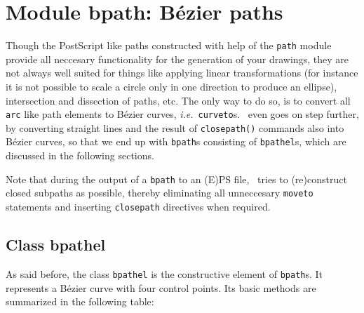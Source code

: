 \chapter{Module bpath: B\'ezier paths}

\label{bpath}

Though the PostScript like paths constructed with help of the
\verb|path| module provide all neccesary functionality for the
generation of your drawings, they are not always well suited for
things like applying linear transformations (for instance it is not
possible to scale a circle only in one direction to produce an
ellipse), intersection and dissection of paths, etc. The only way to
do so, is to convert all \verb|arc| like path elements to B\'ezier
curves, \textit{i.e.}\ \verb|curveto|s. \PyX\ even goes on step further, by
converting straight lines and the result of \verb|closepath()|
commands also into B\'ezier curves, so that we end up with \verb|bpath|s
consisting of \verb|bpathel|s, which are discussed in the following
sections.

Note that during the output of a \verb|bpath| to an (E)PS file, \PyX\ tries to
(re)construct closed subpaths as possible, thereby eliminating all
unneccesary \texttt{moveto} statements and inserting
\texttt{closepath} directives when required.

\section{Class bpathel}

As said before, the class \verb|bpathel| is the constructive element
of \verb|bpath|s. It represents a B\'ezier curve with four control
points.
Its basic methods are summarized in the following table:

